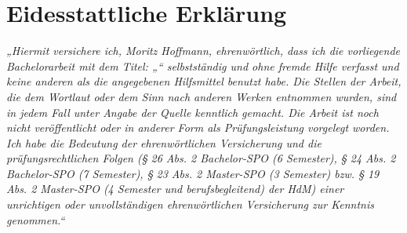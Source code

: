 \documentclass[../main.tex]{subfiles}
\begin{document}
\chapter*{Eidesstattliche Erklärung}
\emph{„Hiermit versichere ich, Moritz Hoffmann, ehrenwörtlich, dass ich die vorliegende Bachelorarbeit mit dem Titel: „\Thema“ selbstständig und ohne fremde Hilfe verfasst und keine anderen als die angegebenen Hilfsmittel benutzt habe. Die Stellen der Arbeit, die dem Wortlaut oder dem Sinn nach anderen Werken entnommen wurden, sind in jedem Fall unter Angabe der Quelle kenntlich gemacht. Die Arbeit ist noch nicht veröffentlicht oder in anderer Form als Prüfungsleistung vorgelegt worden. Ich habe die Bedeutung der ehrenwörtlichen Versicherung und die prüfungsrechtlichen Folgen (\S{} 26 Abs. 2 Bachelor-SPO (6 Semester), \S{} 24 Abs. 2 Bachelor-SPO (7 Semester), \S{} 23 Abs. 2 Master-SPO (3 Semester) bzw. \S{} 19 Abs. 2 Master-SPO (4 Semester und berufsbegleitend) der HdM) einer unrichtigen oder unvollständigen ehrenwörtlichen Versicherung zur Kenntnis genommen.“
}
\vspace{1.5cm}
\signatureAndDate
\newpage
\end{document}
